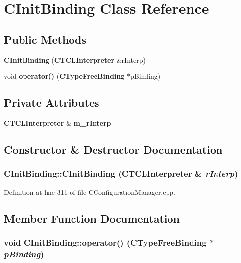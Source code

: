 \section{CInit\-Binding  Class Reference}
\label{classCInitBinding}
\subsection*{Public Methods}
\begin{CompactItemize}
\item 
{\bf CInit\-Binding} ({\bf CTCLInterpreter} \&r\-Interp)
\item 
void {\bf operator()} ({\bf CType\-Free\-Binding} $\ast$p\-Binding)
\end{CompactItemize}
\subsection*{Private Attributes}
\begin{CompactItemize}
\item 
{\bf CTCLInterpreter} \& {\bf m\_\-r\-Interp}
\end{CompactItemize}


\subsection{Constructor \& Destructor Documentation}
\subsubsection{\setlength{\rightskip}{0pt plus 5cm}CInit\-Binding::CInit\-Binding ({\bf CTCLInterpreter} \& {\em r\-Interp})\hspace{0.3cm}{\tt  [inline]}}\label{classCInitBinding_a0}




Definition at line 311 of file CConfiguration\-Manager.cpp.

\subsection{Member Function Documentation}
\subsubsection{\setlength{\rightskip}{0pt plus 5cm}void CInit\-Binding::operator() ({\bf CType\-Free\-Binding} $\ast$ {\em p\-Binding})\hspace{0.3cm}{\tt  [inline]}}\label{classCInitBinding_a1}




